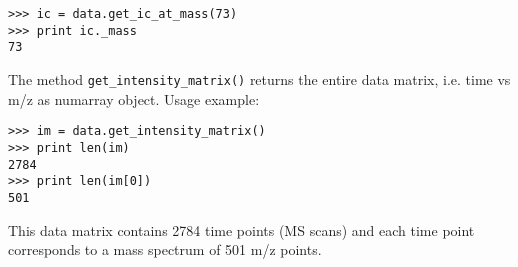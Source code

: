 \begin{verbatim}
>>> ic = data.get_ic_at_mass(73)
>>> print ic._mass
73
\end{verbatim}

The method {\tt get\_intensity\_matrix()} returns the entire data matrix,
i.e. time vs m/z as numarray object. Usage example:

\begin{verbatim}
>>> im = data.get_intensity_matrix()
>>> print len(im)
2784
>>> print len(im[0])
501
\end{verbatim}

This data matrix contains 2784 time points (MS scans) and each time point
corresponds to a mass spectrum of 501 m/z points.



